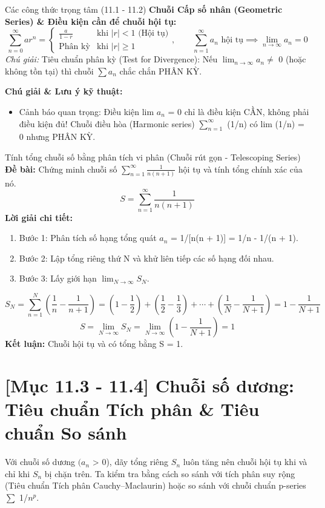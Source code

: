 \documentclass[11pt,a4paper,oneside]{book}
\begin{document}
\begin{congthuc}{Các công thức trọng tâm (11.1 - 11.2)}
\noindent\textbf{Chuỗi Cấp số nhân (Geometric Series) \& Điều kiện cần để chuỗi hội tụ:}
\[ \sum_{n=0}^\infty a r^n = \begin{cases} \frac{a}{1 - r} & \text{khi } |r| < 1 \text{ (Hội tụ)} \\ \text{Phân kỳ} & \text{khi } |r| \ge 1 \end{cases}, \qquad \sum_{n=1}^\infty a_n \text{ hội tụ} \implies \lim_{n \to \infty} a_n = 0 \]
\noindent\textit{Chú giải:} Tiêu chuẩn phân kỳ (Test for Divergence): Nếu $\lim_{n\to \infty} a_n \neq$  0 (hoặc không tồn tại) thì chuỗi $\sum a_n$ chắc chắn PHÂN KỲ.\\[4pt]
\end{congthuc}

\noindent\textbf{Chú giải \& Lưu ý kỹ thuật:}
\begin{itemize}[leftmargin=1.5em, itemsep=2pt]
  \item Cảnh báo quan trọng: Điều kiện lim $a_n$ = 0 chỉ là điều kiện CẦN, không phải điều kiện đủ! Chuỗi điều hòa (Harmonic series) $\sum_{n=1}^\infty$ (1/n) có lim (1/n) = 0 nhưng PHÂN KỲ.
\end{itemize}

\begin{vidu}{Tính tổng chuỗi số bằng phân tích vi phân (Chuỗi rút gọn - Telescoping Series)}
\textbf{Đề bài:} Chứng minh chuỗi số $\sum_{n=1}^\infty \frac{1}{n(n + 1)}$ hội tụ và tính tổng chính xác của nó.
\[ S = \sum_{n=1}^\infty \frac{1}{n(n + 1)} \]
\textbf{Lời giải chi tiết:}
\begin{enumerate}[leftmargin=1.5em, itemsep=2pt]
  \item Bước 1: Phân tích số hạng tổng quát $a_n$ = 1/[n(n + 1)] = 1/n - 1/(n + 1).
  \item Bước 2: Lập tổng riêng thứ N và khử liên tiếp các số hạng đối nhau.
  \item Bước 3: Lấy giới hạn $\lim_{N\to \infty} S_N$.
\end{enumerate}
\[ S_N = \sum_{n=1}^N \left(\frac{1}{n} - \frac{1}{n + 1}\right) = \left(1 - \frac{1}{2}\right) + \left(\frac{1}{2} - \frac{1}{3}\right) + \cdots + \left(\frac{1}{N} - \frac{1}{N + 1}\right) = 1 - \frac{1}{N + 1} \]
\[ S = \lim_{N \to \infty} S_N = \lim_{N \to \infty} \left(1 - \frac{1}{N + 1}\right) = 1 \]
\noindent\textbf{Kết luận:} Chuỗi hội tụ và có tổng bằng S = 1.
\end{vidu}

\section{[Mục 11.3 - 11.4] Chuỗi số dương: Tiêu chuẩn Tích phân \& Tiêu chuẩn So sánh}
Với chuỗi số dương $(a_n$ > 0), dãy tổng riêng $S_n$ luôn tăng nên chuỗi hội tụ khi và chỉ khi $S_n$ bị chặn trên. Ta kiểm tra bằng cách so sánh với tích phân suy rộng (Tiêu chuẩn Tích phân Cauchy–Maclaurin) hoặc so sánh với chuỗi chuẩn p-series $\sum$ 1/$n^p$.
\end{document}
